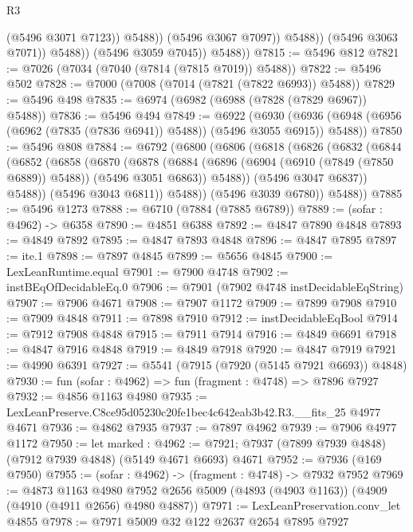 \begin{lexlean}{R3}
\begin{coremodule}
                            (@5496 @3071 @7123))
                          @5488))
                      (@5496 @3067 @7097))
                    @5488))
                (@5496 @3063 @7071))
              @5488))
          (@5496 @3059 @7045))
        @5488))
@7815 := @5496 @812
@7821 := @7026 (@7034 (@7040 (@7814 (@7815 @7019)) @5488))
@7822 := @5496 @502
@7828 := @7000 (@7008 (@7014 (@7821 (@7822 @6993)) @5488))
@7829 := @5496 @498
@7835 := @6974 (@6982 (@6988 (@7828 (@7829 @6967)) @5488))
@7836 := @5496 @494
@7849 := @6922
    (@6930 (@6936 (@6948 (@6956 (@6962 (@7835 (@7836 @6941)) @5488)) (@5496 @3055 @6915)) @5488))
@7850 := @5496 @808
@7884 := @6792
    (@6800
      (@6806
        (@6818
          (@6826
            (@6832
              (@6844
                (@6852
                  (@6858
                    (@6870
                      (@6878
                        (@6884
                          (@6896 (@6904 (@6910 (@7849 (@7850 @6889)) @5488)) (@5496 @3051 @6863))
                          @5488))
                      (@5496 @3047 @6837))
                    @5488))
                (@5496 @3043 @6811))
              @5488))
          (@5496 @3039 @6780))
        @5488))
@7885 := @5496 @1273
@7888 := @6710 (@7884 (@7885 @6789))
@7889 := (sofar : @4962) -> @6358
@7890 := @4851 @6388
@7892 := @4847 @7890 @4848
@7893 := @4849 @7892
@7895 := @4847 @7893 @4848
@7896 := @4847 @7895
@7897 := ite.{1}
@7898 := @7897 @4845
@7899 := @5656 @4845
@7900 := LexLeanRuntime.equal
@7901 := @7900 @4748
@7902 := instBEqOfDecidableEq.{0}
@7906 := @7901 (@7902 @4748 instDecidableEqString)
@7907 := @7906 @4671
@7908 := @7907 @1172
@7909 := @7899 @7908
@7910 := @7909 @4848
@7911 := @7898 @7910
@7912 := instDecidableEqBool
@7914 := @7912 @7908 @4848
@7915 := @7911 @7914
@7916 := @4849 @6691
@7918 := @4847 @7916 @4848
@7919 := @4849 @7918
@7920 := @4847 @7919
@7921 := @4990 @6391
@7927 := @5541 (@7915 (@7920 (@5145 @7921 @6693)) @4848)
@7930 := fun (sofar : @4962) => fun (fragment : @4748) => @7896 @7927
@7932 := @4856 @1163 @4980
@7935 := LexLeanPreserve.C8ce95d05230c20fe1bec4c642eab3b42.R3.__fits_25 @4977 @4671
@7936 := @4862 @7935
@7937 := @7897 @4962
@7939 := @7906 @4977 @1172
@7950 := let marked : @4962 := @7921;
  @7937 (@7899 @7939 @4848) (@7912 @7939 @4848) (@5149 @4671 @6693) @4671
@7952 := @7936 (@169 @7950)
@7955 := (sofar : @4962) -> (fragment : @4748) -> @7932 @7952
@7969 := @4873
    @1163
    @4980
    @7952
    @2656
    @5009
    (@4893 (@4903 @1163))
    (@4909 (@4910 (@4911 @2656) @4980 @4887))
@7971 := LexLeanPreservation.conv_let @4855
@7978 := @7971 @5009 @32 @122 @2637 @2654 @7895 @7927

\end{coremodule}
\end{lexlean}
